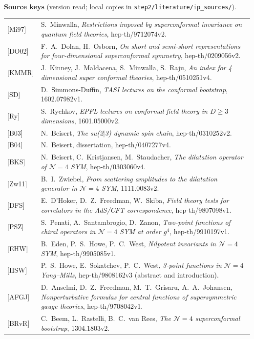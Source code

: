 \documentclass[11pt]{article}
\theoremstyle{definition}
\begin{document}
\textbf{Source keys} (version read; local copies in \texttt{step2/literature/ip\_sources/}).
\begin{longtable}{p{2.0cm}p{14.0cm}}
{[Mi97]} & S.~Minwalla, \emph{Restrictions imposed by superconformal invariance on quantum field theories}, hep-th/9712074v2.\\
{[DO02]} & F.~A.~Dolan, H.~Osborn, \emph{On short and semi-short representations for four-dimensional superconformal symmetry}, hep-th/0209056v2.\\
{[KMMR]} & J.~Kinney, J.~Maldacena, S.~Minwalla, S.~Raju, \emph{An index for 4 dimensional super conformal theories}, hep-th/0510251v4.\\
{[SD]} & D.~Simmons-Duffin, \emph{TASI lectures on the conformal bootstrap}, 1602.07982v1.\\
{[Ry]} & S.~Rychkov, \emph{EPFL lectures on conformal field theory in $D\ge3$ dimensions}, 1601.05000v2.\\
{[B03]} & N.~Beisert, \emph{The su(2$|$3) dynamic spin chain}, hep-th/0310252v2.\\
{[B04]} & N.~Beisert, dissertation, hep-th/0407277v4.\\
{[BKS]} & N.~Beisert, C.~Kristjansen, M.~Staudacher, \emph{The dilatation operator of $\mathcal N=4$ SYM}, hep-th/0303060v4.\\
{[Zw11]} & B.~I.~Zwiebel, \emph{From scattering amplitudes to the dilatation generator in $\mathcal N=4$ SYM}, 1111.0083v2.\\
{[DFS]} & E.~D'Hoker, D.~Z.~Freedman, W.~Skiba, \emph{Field theory tests for correlators in the AdS/CFT correspondence}, hep-th/9807098v1.\\
{[PSZ]} & S.~Penati, A.~Santambrogio, D.~Zanon, \emph{Two-point functions of chiral operators in $\mathcal N=4$ SYM at order $g^4$}, hep-th/9910197v1.\\
{[EHW]} & B.~Eden, P.~S.~Howe, P.~C.~West, \emph{Nilpotent invariants in $\mathcal N=4$ SYM}, hep-th/9905085v1.\\
{[HSW]} & P.~S.~Howe, E.~Sokatchev, P.~C.~West, \emph{3-point functions in $\mathcal N=4$ Yang--Mills}, hep-th/9808162v3 (abstract and introduction).\\
{[AFGJ]} & D.~Anselmi, D.~Z.~Freedman, M.~T.~Grisaru, A.~A.~Johansen, \emph{Nonperturbative formulas for central functions of supersymmetric gauge theories}, hep-th/9708042v1.\\
{[BRvR]} & C.~Beem, L.~Rastelli, B.~C.~van Rees, \emph{The $\mathcal N=4$ superconformal bootstrap}, 1304.1803v2.\\

\end{longtable}
\end{document}
